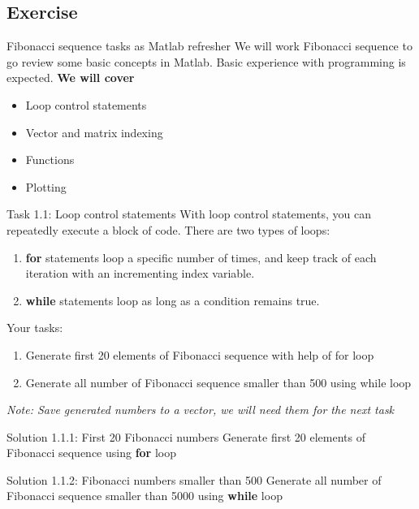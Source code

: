 \subsection{Exercise}
\begin{frame}{Fibonacci sequence tasks as  Matlab refresher}
    We will work Fibonacci sequence to go review some basic concepts in Matlab. Basic experience with programming is expected. 
    \vfill
    \textbf{We will cover }
    \begin{itemize}
        \item Loop control statements
        \item Vector and matrix indexing
        \item Functions
        \item Plotting
    \end{itemize}
\end{frame}


\begin{frame}{Task 1.1: Loop control statements}
With loop control statements, you can repeatedly execute a block of code. There are two types of loops:
\begin{enumerate}
    \item \textbf{for} statements loop a specific number of times, and keep track of each iteration with an incrementing index variable.
    \item \textbf{while} statements loop as long as a condition remains true.
\end{enumerate}

Your tasks: 
 \begin{enumerate}
     \item  Generate first 20 elements of Fibonacci sequence with help of for loop
     \item  Generate all number of Fibonacci sequence smaller than 500 using while loop
 \end{enumerate}
 \textit{Note: Save generated numbers to a vector, we will need them for the next task}
\end{frame}


\begin{frame}[fragile]{Solution 1.1.1: First 20 Fibonacci numbers } 
Generate first 20 elements of Fibonacci sequence using \textbf{for} loop
\vfill
\small

\end{frame}

\begin{frame}[fragile]{Solution 1.1.2: Fibonacci numbers smaller than 500} 
Generate all number of Fibonacci sequence smaller than 5000 using \textbf{while} loop
\vfill
\small

\end{frame}

